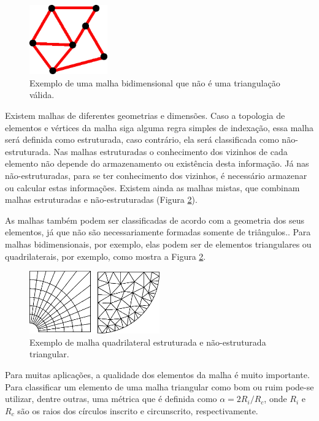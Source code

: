  \begin{figure}[htbp]
 	\centering
 	\includegraphics[width=0.3\textwidth]{fig/malha_invalida.png}
 	\caption{Exemplo de uma malha bidimensional que não é uma triangulação válida.} 
 	\label{fig:malha_invalida}
 \end{figure}


Existem malhas de diferentes geometrias e dimensões. Caso a topologia de elementos e vértices da malha siga alguma regra simples de indexação, essa malha será definida como estruturada, caso contrário, ela será classificada como não-estruturada. Nas malhas estruturadas o conhecimento dos vizinhos de cada elemento não depende do armazenamento ou existência desta informação. Já nas não-estruturadas, para se ter conhecimento dos vizinhos, é necessário armazenar ou calcular estas informações. Existem ainda as malhas mistas, que combinam malhas estruturadas e não-estruturadas (Figura \ref{fig:est_e_n_est}).

As malhas também podem ser classificadas de acordo com a geometria dos seus elementos, já que não são necessariamente formadas somente de triângulos.. Para malhas bidimensionais, por exemplo, elas podem ser de elementos triangulares ou quadrilaterais, por exemplo, como mostra a Figura \ref{fig:est_e_n_est}.

 \begin{figure}[htbp]
     \centering
     \includegraphics[width=0.5\textwidth]{fig/est_e_n_est.png}
     \caption{Exemplo de malha quadrilateral estruturada e não-estruturada triangular.} 
     \label{fig:est_e_n_est}
 \end{figure}
 
Para muitas aplicações, a qualidade dos elementos da malha é muito importante. Para classificar um elemento de uma malha triangular como bom ou ruim pode-se utilizar, dentre outras, uma métrica que é definida como $ \alpha = 2R_i / R_c $, onde $R_i$ e $R_c$ são os raios dos círculos inscrito e circunscrito, respectivamente. 
 
